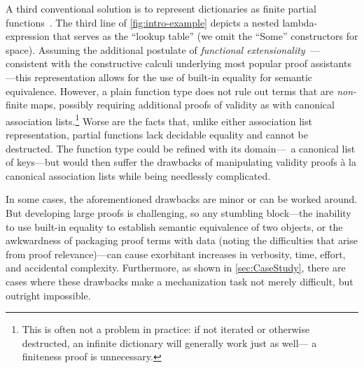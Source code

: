 A third conventional solution is to represent dictionaries as finite partial functions~\cite[Maps]{Pierce:SF1}.
%
The third line of \autoref{fig:intro-example} depicts a nested lambda-expression that serves as the ``lookup table'' (we omit the ``Some'' constructors for space).
%
%
Assuming the additional postulate of \emph{functional extensionality}~\mbox{\cite[Logic]{Pierce:SF1}}---consistent with the constructive calculi underlying most popular proof assistants---this representation allows for the use of built-in equality for semantic equivalence.
%
However, a plain function type does not rule out terms that are \emph{non-}finite maps, possibly requiring additional proofs of validity as with canonical association lists.\footnote{\hspace{0.01in}%
%
This is often not a problem in practice:
%
if not iterated or otherwise destructed, an infinite dictionary will generally work just as well---%
%
a finiteness proof is unnecessary.
%
}
%
Worse are the facts that, unlike either association list representation, partial functions lack decidable equality and cannot be destructed.
%
The function type could be refined with its domain---\ie{}~a canonical list of keys---but would then suffer the drawbacks of manipulating validity proofs \`{a} la canonical association lists while being needlessly complicated.

In some cases, the aforementioned drawbacks are minor or can be worked around.
%
But developing large proofs is challenging, so any stumbling block---the inability to use built-in equality to establish semantic equivalence of two objects, or the awkwardness of packaging proof terms with data (noting the difficulties that arise from proof relevance)---can cause exorbitant increases in verbosity, time, effort, and accidental complexity.
%
Furthermore, as shown in \autoref{sec:CaseStudy}, there are cases where these drawbacks make a mechanization task not merely difficult, but outright impossible.



